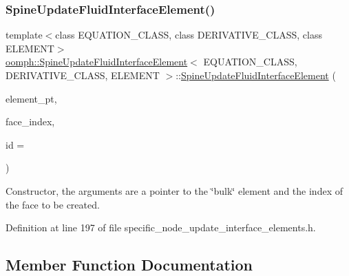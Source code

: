 \subsubsection{\texorpdfstring{Spine\+Update\+Fluid\+Interface\+Element()}{SpineUpdateFluidInterfaceElement()}}
{\footnotesize\ttfamily template$<$class E\+Q\+U\+A\+T\+I\+O\+N\+\_\+\+C\+L\+A\+SS, class D\+E\+R\+I\+V\+A\+T\+I\+V\+E\+\_\+\+C\+L\+A\+SS, class E\+L\+E\+M\+E\+NT$>$ \\
\hyperlink{classoomph_1_1SpineUpdateFluidInterfaceElement}{oomph\+::\+Spine\+Update\+Fluid\+Interface\+Element}$<$ E\+Q\+U\+A\+T\+I\+O\+N\+\_\+\+C\+L\+A\+SS, D\+E\+R\+I\+V\+A\+T\+I\+V\+E\+\_\+\+C\+L\+A\+SS, E\+L\+E\+M\+E\+NT $>$\+::\hyperlink{classoomph_1_1SpineUpdateFluidInterfaceElement}{Spine\+Update\+Fluid\+Interface\+Element} (\begin{DoxyParamCaption}\item[{\hyperlink{classoomph_1_1FiniteElement}{Finite\+Element} $\ast$const \&}]{element\+\_\+pt,  }\item[{const int \&}]{face\+\_\+index,  }\item[{const unsigned \&}]{id = {} }\end{DoxyParamCaption})\hspace{0.3cm}{\ttfamily [inline]}}



Constructor, the arguments are a pointer to the \char`\"{}bulk\char`\"{} element and the index of the face to be created. 



Definition at line 197 of file specific\+\_\+node\+\_\+update\+\_\+interface\+\_\+elements.\+h.



\subsection{Member Function Documentation}
\mbox{\label{classoomph_1_1SpineUpdateFluidInterfaceElement_a3958845051cafecd8e73745fc04c7a78}} 
